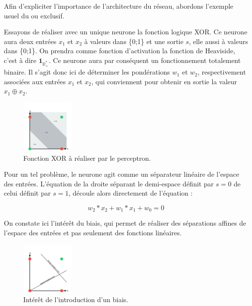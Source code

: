 \documentclass[a4paper,oneside]{report}
\begin{document}
                Afin d'expliciter l'importance de l'architecture du réseau, abordons l'exemple usuel du ou exclusif.

                Essayons de réaliser avec un unique neurone la fonction logique XOR. Ce neurone aura deux entrées $x_{1}$ et $x_{2}$ à  valeurs dans \{0;1\} et une sortie $s$, elle aussi à  valeurs dans \{0;1\}. On prendra comme fonction d'activation la fonction de Heaviside, c'est à  dire $\mathbf{1}_{\mathbb{R}^{*}_{+}}$. Ce neurone aura par conséquent un fonctionnement totalement binaire. Il s'agit donc ici de déterminer les pondérations $w_{1}$ et $w_{2}$, respectivement associées aux entrées $x_{1}$ et $x_{2}$, qui conviennent pour obtenir en sortie la valeur $x_{1}\oplus x_{2}$.\\

                \begin{figure}
                    \begin{center}
                        \includegraphics[width=100px]{Images/xor-01.png}
                    \end{center}
                    \caption{Fonction XOR à réaliser par le perceptron.}
                \end{figure}

                Pour un tel problème, le neurone agit comme un séparateur linéaire de l'espace des entrées. L'équation de la droite séparant le demi-espace définit par $s=0$ de celui définit par $s=1$, découle alors directement de l'équation :

                \begin{equation}w_{2}*x_{2}+w_{1}*x_{1}+w_{0}=0\end{equation}

                On constate ici l'intérêt du biais, qui permet de réaliser des séparations affines de l'espace des entrées et pas seulement des fonctions linéaires.

                \begin{figure}
                    \begin{center}
                        \includegraphics[width=100px]{Images/biais-01.png}
                    \end{center}
                    \caption{Intérêt de l'introduction d'un biais.}
                \end{figure}
\end{document}
